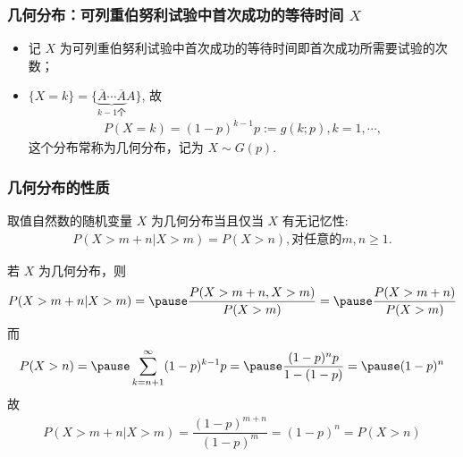 \begin{frame}
	\frametitle{几何分布：可列重伯努利试验中首次成功的等待时间 $X$}
	\begin{itemize}[<+-|alert@+>]
		\item 记 $X$ 为可列重伯努利试验中首次成功的等待时间即首次成功所需要试验的次数；
		\item $\{X=k\}=\{\underbrace{\overline{A}\cdots \overline{A}}_{k-1\mbox{个}} A\}$, 故
		      \begin{eqnarray*}
			      P(X=k)=(1-p)^{k-1}p:=g(k;p), k=1,\cdots,
		      \end{eqnarray*}
		      这个分布常称为几何分布，记为 $X\sim G (p)$.
	\end{itemize}
\end{frame}
\begin{frame}
	\frametitle{几何分布的性质}
	\begin{thm}
		取值自然数的随机变量 $X$ 为几何分布当且仅当 $X$ 有无记忆性:
		\begin{eqnarray}\label{eq:memory}
			P (X>m+n|X>m)=P (X>n), \mbox{对任意的} m,n \ge 1.
		\end{eqnarray}
	\end{thm}
	\zheng 若 $X$ 为几何分布，则
	\begin{eqnarray*}
		P(X>m+n|X>m)=\pause \dfrac{P(X>m+n,X>m)}{P(X>m)}=\pause \dfrac{P(X>m+n)}{P(X>m)}
	\end{eqnarray*}
	\pause 而
	\begin{eqnarray*}
		P(X>n)=\pause \sum_{k=n+1}^\infty (1-p)^{k-1}p=\pause \dfrac{(1-p)^{n}p}{1-(1-p)}=\pause (1-p)^n
	\end{eqnarray*}
	\pause 故
	\begin{eqnarray*}
		P(X>m+n|X>m)=\dfrac{(1-p)^{m+n}}{(1-p)^m}=(1-p)^n=P(X>n)
	\end{eqnarray*}

\end{frame}

